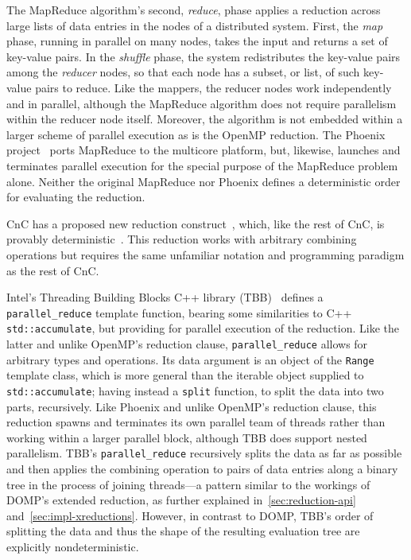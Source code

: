The MapReduce algorithm's second, \textit{reduce}, phase applies a reduction across large lists of data entries in the nodes of a distributed system\cite{dean08mapreduce}.  First, the \textit{map} phase, running in parallel on many nodes, takes the input and returns a set of key-value pairs.  In the \textit{shuffle} phase, the system redistributes the key-value pairs among the \textit{reducer} nodes, so that each node has a subset, or list, of such key-value pairs to reduce.  Like the mappers, the reducer nodes work independently and in parallel, although the MapReduce algorithm does not require parallelism within the reducer node itself.  Moreover, the algorithm is not embedded within a larger scheme of parallel execution as is the OpenMP reduction.  The Phoenix project~\cite{ranger07mapreduce} ports MapReduce to the multicore platform, but, likewise, launches and terminates parallel execution for the special purpose of the MapReduce problem alone.  Neither the original MapReduce nor Phoenix defines a deterministic order for evaluating the reduction.

CnC has a proposed new reduction construct~\cite{budimlic11deterministic}, which, like the
rest of CnC, is provably deterministic~\cite{budimlic10cnc}.  This reduction works with arbitrary combining operations but requires the same unfamiliar notation and programming paradigm as the rest of CnC.

Intel's Threading Building Blocks C++ library (TBB)~\cite{intel12tbb} defines a \texttt{parallel\_reduce} template function, bearing some similarities to C++ \texttt{std::accumulate}, but providing for parallel execution of the reduction.  Like the latter and unlike OpenMP's reduction clause, \texttt{parallel\_reduce} allows for arbitrary types and operations. Its data argument is an object of the \texttt{Range} template class, which is more general than the iterable object supplied to \texttt{std::accumulate}; having instead a \texttt{split} function, to split the data into two parts, recursively.  Like Phoenix and unlike OpenMP's reduction clause, this reduction spawns and terminates its own parallel team of threads rather than working within a larger parallel block, although TBB does support nested parallelism.  TBB's \texttt{parallel\_reduce} recursively splits the data as far as possible and then applies the combining operation to pairs of data entries along a binary tree in the process of joining threads---a pattern similar to the workings of DOMP's extended reduction, as further explained in~\ref{sec:reduction-api} 
and~\ref{sec:impl-xreductions}.  However, in contrast to DOMP, TBB's order of splitting the data and thus the shape of the resulting evaluation tree are explicitly nondeterministic.

